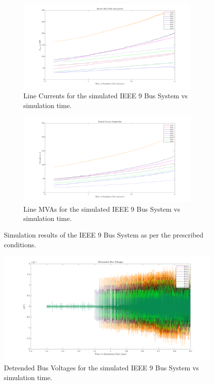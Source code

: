 \begin{figure}[!htpb]
	\begin{subfigure}{\textwidth}
		\centering
		\includegraphics[scale=0.25]{../figures/analysis_matlab/currents_run02}
		\caption{Line Currents for the simulated IEEE 9 Bus System vs simulation time.}
	\end{subfigure}
	
	\begin{subfigure}{\textwidth}
		\centering
		\includegraphics[scale=0.25]{../figures/analysis_matlab/mvas_run02}
		\caption{Line MVAs for the simulated IEEE 9 Bus System vs simulation time.}
	\end{subfigure}

	\caption{Simulation results of the IEEE 9 Bus System as per the prescribed conditions.}
\end{figure}

\begin{figure}[!htpb]
	\centering
	\includegraphics[scale=0.25]{../figures/analysis_matlab/voltsDetrended_run02}
	\caption{Detrended Bus Voltages for the simulated IEEE 9 Bus System vs simulation time.}
\end{figure}

